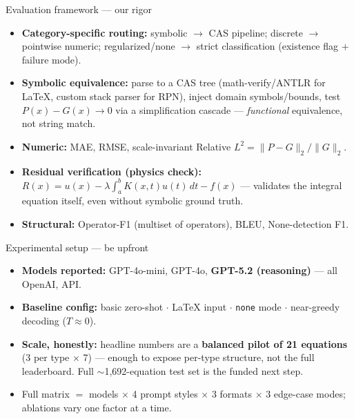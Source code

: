 \documentclass[10pt,aspectratio=169]{beamer}
\begin{document}
\begin{frame}{Evaluation framework --- our rigor}
  \begin{itemize}
    \item \textbf{Category-specific routing:} symbolic $\to$ CAS pipeline; discrete $\to$ pointwise
          numeric; regularized/none $\to$ strict classification (existence flag $+$ failure mode).
    \item \textbf{Symbolic equivalence:} parse to a CAS tree (math-verify/ANTLR for \LaTeX{},
          custom stack parser for RPN), inject domain symbols/bounds, test $P(x)-G(x)\!\to\!0$ via a
          simplification cascade --- \emph{functional} equivalence, not string match.
    \item \textbf{Numeric:} MAE, RMSE, scale-invariant Relative $L^2 = \|P-G\|_2 / \|G\|_2$.
    \item \textbf{Residual verification (physics check):}
          $R(x) = u(x) - \lambda\!\int_a^b\! K(x,t)u(t)\,dt - f(x)$ --- validates the integral
          equation itself, even without symbolic ground truth.
    \item \textbf{Structural:} Operator-F1 (multiset of operators), BLEU, None-detection F1.
  \end{itemize}
\end{frame}

\begin{frame}{Experimental setup --- be upfront}
  \begin{itemize}
    \item \textbf{Models reported:} GPT-4o-mini, GPT-4o, \textbf{GPT-5.2 (reasoning)} --- all OpenAI, API.
    \item \textbf{Baseline config:} basic zero-shot $\cdot$ \LaTeX{} input $\cdot$ \texttt{none} mode
          $\cdot$ near-greedy decoding ($T\approx0$).
    \item \textbf{Scale, honestly:} headline numbers are a \textbf{balanced pilot of 21 equations}
          (3 per type $\times$ 7) --- enough to expose per-type structure, not the full leaderboard.
          Full $\sim$1{,}692-equation test set is the funded next step.
    \item Full matrix $=$ models $\times$ 4 prompt styles $\times$ 3 formats $\times$ 3 edge-case modes;
          ablations vary one factor at a time.
  \end{itemize}
\end{frame}
\end{document}
